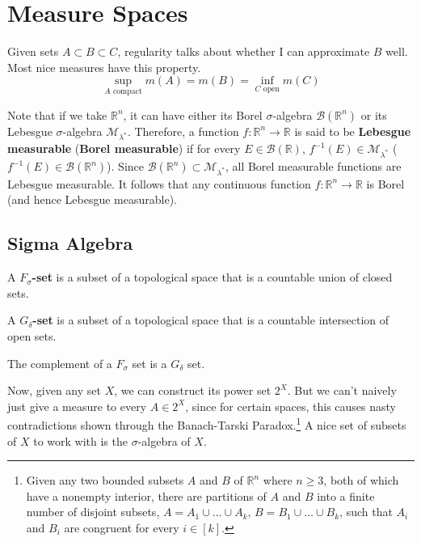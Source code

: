 \section{Measure Spaces}

  Given sets $A \subset B \subset C$, regularity talks about whether I can approximate $B$ well. Most nice measures have this property. 
  \begin{equation}
    \sup_{A \text{ compact}} m(A) = m(B) = \inf_{C \text{ open}} m(C)
  \end{equation}

  Note that if we take $\mathbb{R}^n$, it can have either its Borel $\sigma$-algebra $\mathcal{B}(\mathbb{R}^n)$ or its Lebesgue $\sigma$-algebra $\mathcal{M}_{\lambda^*}$. Therefore, a function $f: \mathbb{R}^n \longrightarrow \mathbb{R}$ is said to be \textbf{Lebesgue measurable} (\textbf{Borel measurable}) if for every $E \in \mathcal{B}(\mathbb{R})$, $f^{-1}(E) \in \mathcal{M}_{\lambda^*}$ ($f^{-1}(E) \in \mathcal{B}(\mathbb{R}^n)$). Since $\mathcal{B}(\mathbb{R}^n) \subset \mathcal{M}_{\lambda^*}$, all Borel measurable functions are Lebesgue measurable. It follows that any continuous function $f: \mathbb{R}^n \longrightarrow \mathbb{R}$ is Borel (and hence Lebesgue measurable). 

\subsection{Sigma Algebra}

  \begin{definition}
    A \textbf{$F_\sigma$-set} is a subset of a topological space that is a countable union of closed sets. 
  \end{definition}

  \begin{definition}
    A \textbf{$G_\delta$-set} is a subset of a topological space  that is a countable intersection of open sets. 
  \end{definition}

  \begin{lemma}
    The complement of a $F_\sigma$ set is a $G_\delta$ set. 
  \end{lemma} 
  
  Now, given any set $X$, we can construct its power set $2^X$. But we can't naively just give a measure to every $A \in 2^X$, since for certain spaces, this causes nasty contradictions shown through the Banach-Tarski Paradox.\footnote{Given any two bounded subsets $A$ and $B$ of $\mathbb{R}^n$ where $n \geq 3$, both of which have a nonempty interior, there are partitions of $A$ and $B$ into a finite number of disjoint subsets, $A = A_1 \cup \ldots \cup A_k$, $B = B_1 \cup \ldots \cup B_k$, such that $A_i$ and $B_i$ are congruent for every $i \in [k]$.} A nice set of subsets of $X$ to work with is the $\sigma$-algebra of $X$. 

